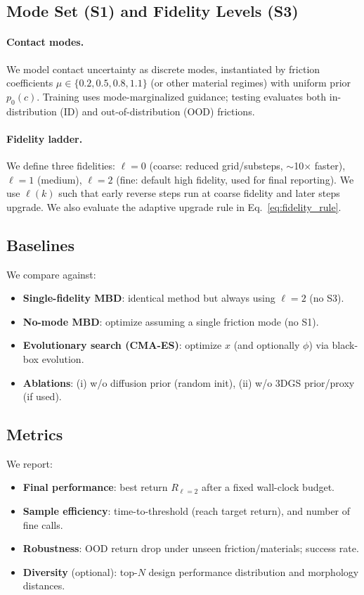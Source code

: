 \subsection{Mode Set (S1) and Fidelity Levels (S3)}
\label{subsec:mode_fidelity}

\paragraph{Contact modes.}
We model contact uncertainty as discrete modes, instantiated by friction coefficients
$\mu\in\{0.2,0.5,0.8,1.1\}$ (or other material regimes) with uniform prior $p_0(c)$.
Training uses mode-marginalized guidance; testing evaluates both in-distribution (ID) and
out-of-distribution (OOD) frictions.

\paragraph{Fidelity ladder.}
We define three fidelities:
$\ell=0$ (coarse: reduced grid/substeps, $\sim$10$\times$ faster),
$\ell=1$ (medium),
$\ell=2$ (fine: default high fidelity, used for final reporting).
We use $\ell(k)$ such that early reverse steps run at coarse fidelity and later steps upgrade.
We also evaluate the adaptive upgrade rule in Eq.~\eqref{eq:fidelity_rule}.

\subsection{Baselines}
\label{subsec:baselines}

We compare against:
\begin{itemize}
\item \textbf{Single-fidelity MBD}: identical method but always using $\ell=2$ (no S3).
\item \textbf{No-mode MBD}: optimize assuming a single friction mode (no S1).
\item \textbf{Evolutionary search (CMA-ES)}: optimize $x$ (and optionally $\phi$) via black-box evolution.
\item \textbf{Ablations}: (i) w/o diffusion prior (random init), (ii) w/o 3DGS prior/proxy (if used).
\end{itemize}

\subsection{Metrics}
\label{subsec:metrics}

We report:
\begin{itemize}
\item \textbf{Final performance}: best return $R_{\ell=2}$ after a fixed wall-clock budget.
\item \textbf{Sample efficiency}: time-to-threshold (reach target return), and number of fine calls.
\item \textbf{Robustness}: OOD return drop under unseen friction/materials; success rate.
\item \textbf{Diversity} (optional): top-$N$ design performance distribution and morphology distances.
\end{itemize}

